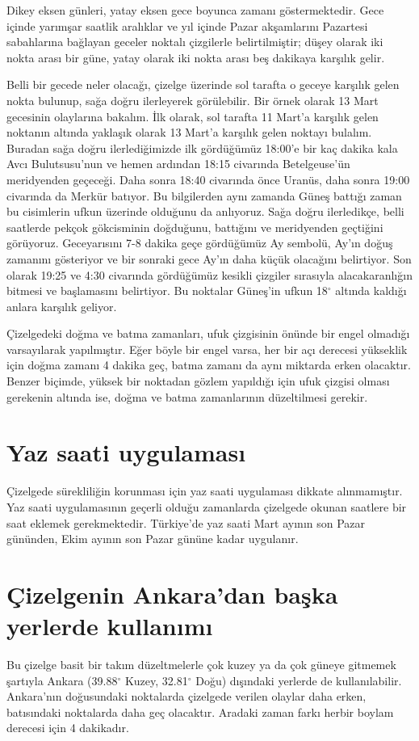 \documentclass[12pt]{article}
\begin{document}
Dikey eksen günleri, yatay eksen gece boyunca zamanı göstermektedir.
Gece içinde yarımşar saatlik aralıklar ve yıl içinde Pazar akşamlarını
Pazartesi sabahlarına bağlayan geceler noktalı çizgilerle
belirtilmiştir; düşey olarak iki nokta arası bir güne, yatay olarak iki
nokta arası beş dakikaya karşılık gelir.

Belli bir gecede neler olacağı, çizelge üzerinde sol tarafta o
geceye karşılık gelen nokta bulunup, sağa doğru ilerleyerek
görülebilir.  Bir örnek olarak 13 Mart gecesinin olaylarına
bakalım. İlk olarak, sol tarafta 11 Mart'a karşılık gelen
noktanın altında yaklaşık olarak 13 Mart'a karşılık gelen
noktayı bulalım. Buradan sağa doğru ilerlediğimizde ilk
gördüğümüz 18:00'e bir kaç dakika kala Avcı Bulutsusu'nun
ve hemen ardından 18:15 civarında Betelgeuse'ün meridyenden
geçeceği. Daha sonra 18:40 civarında önce Uranüs, daha sonra
19:00 civarında da Merkür batıyor. Bu bilgilerden aynı zamanda
Güneş battığı zaman bu cisimlerin ufkun üzerinde olduğunu
da anlıyoruz. Sağa doğru ilerledikçe, belli saatlerde pekçok
gökcisminin doğduğunu, battığını ve meridyenden geçtiğini
görüyoruz. Geceyarısını 7-8 dakika geçe gördüğümüz Ay
sembolü, Ay'ın doğuş zamanını gösteriyor ve bir sonraki gece
Ay'ın daha küçük olacağını belirtiyor. Son olarak 19:25
ve 4:30 civarında gördüğümüz kesikli çizgiler sırasıyla
alacakaranlığın bitmesi ve başlamasını belirtiyor. Bu noktalar
Güneş'in ufkun 18$^\circ$ altında kaldığı anlara karşılık
geliyor.

Çizelgedeki doğma ve batma zamanları, ufuk çizgisinin önünde bir engel
olmadığı varsa\-yılarak yapılmıştır. Eğer böyle bir engel varsa, her bir
açı derecesi yükseklik için doğma zamanı 4 dakika geç, batma zamanı da
aynı miktarda erken olacaktır. Benzer biçimde, yüksek bir noktadan gözlem
yapıldığı için ufuk çizgisi olması gerekenin altında ise, doğma ve batma
zamanlarının düzeltilmesi gerekir.

\section{Yaz saati uygulaması}
Çizelgede sürekliliğin korunması için yaz saati uygulaması
dikkate alınmamıştır. Yaz saati uygulamasının geçerli olduğu
zamanlarda çizelgede okunan saatlere bir saat eklemek gerekmektedir.
Türkiye'de yaz saati Mart ayının son Pazar gününden, Ekim ayının
son Pazar gününe kadar uygulanır.

\section{Çizelgenin Ankara'dan başka yerlerde kullanımı}
Bu çizelge basit bir takım düzeltmelerle çok kuzey ya da çok güneye
gitmemek şartıyla Ankara (39.88$^\circ$ Kuzey,  32.81$^\circ$ Doğu)
dışındaki yerlerde de kullanılabilir.  Ankara'nın do\-ğu\-sun\-daki
noktalarda çizelgede verilen olaylar daha erken, batısındaki
noktalarda daha geç olacaktır. Aradaki zaman farkı herbir boylam
derecesi için 4 dakikadır.
\end{document}
